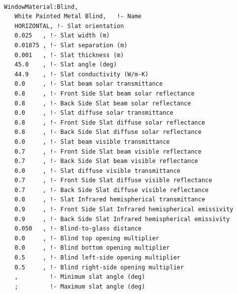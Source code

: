 \begin{lstlisting}

WindowMaterial:Blind,
   White Painted Metal Blind,   !- Name
   HORIZONTAL, !- Slat orientation
   0.025   , !- Slat width (m)
   0.01875 , !- Slat separation (m)
   0.001   , !- Slat thickness (m)
   45.0    , !- Slat angle (deg)
   44.9    , !- Slat conductivity (W/m-K)
   0.0     , !- Slat beam solar transmittance
   0.8     , !- Front Side Slat beam solar reflectance
   0.8     , !- Back Side Slat beam solar reflectance
   0.0     , !- Slat diffuse solar transmittance
   0.8     , !- Front Side Slat diffuse solar reflectance
   0.8     , !- Back Side Slat diffuse solar reflectance
   0.0     , !- Slat beam visible transmittance
   0.7     , !- Front Side Slat beam visible reflectance
   0.7     , !- Back Side Slat beam visible reflectance
   0.0     , !- Slat diffuse visible transmittance
   0.7     , !- Front Side Slat diffuse visible reflectance
   0.7     , !- Back Side Slat diffuse visible reflectance
   0.0     , !- Slat Infrared hemispherical transmittance
   0.9     , !- Front Side Slat Infrared hemispherical emissivity
   0.9     , !- Back Side Slat Infrared hemispherical emissivity
   0.050   , !- Blind-to-glass distance
   0.0     , !- Blind top opening multiplier
   0.0     , !- Blind bottom opening multiplier
   0.5     , !- Blind left-side opening multiplier
   0.5     , !- Blind right-side opening multiplier
   ,         !- Minimum slat angle (deg)
   ;         !- Maximum slat angle (deg)
\end{lstlisting}

